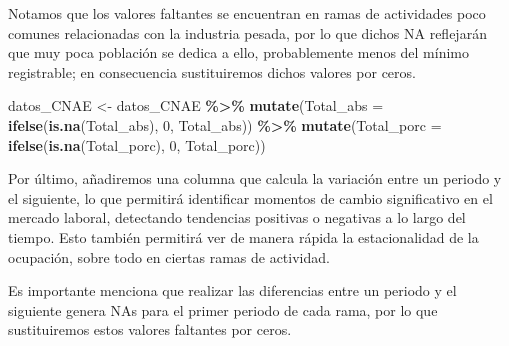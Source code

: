 \documentclass[notspecified,article,submit,moreauthors,pdftex]{Definitions/mdpi}
\newenvironment{Shaded}{\begin{snugshade}}{\end{snugshade}}
\newcommand{\AttributeTok}[1]{\textcolor[rgb]{0.13,0.29,0.53}{#1}}
\newcommand{\DecValTok}[1]{\textcolor[rgb]{0.00,0.00,0.81}{#1}}
\newcommand{\FunctionTok}[1]{\textcolor[rgb]{0.13,0.29,0.53}{\textbf{#1}}}
\newcommand{\NormalTok}[1]{#1}
\newcommand{\OtherTok}[1]{\textcolor[rgb]{0.56,0.35,0.01}{#1}}
\newcommand{\SpecialCharTok}[1]{\textcolor[rgb]{0.81,0.36,0.00}{\textbf{#1}}}
\begin{document}
Notamos que los valores faltantes se encuentran en ramas de actividades
poco comunes relacionadas con la industria pesada, por lo que dichos NA
reflejarán que muy poca población se dedica a ello, probablemente menos
del mínimo registrable; en consecuencia sustituiremos dichos valores por
ceros.

\begin{Shaded}
\begin{Highlighting}[]
\NormalTok{datos\_CNAE }\OtherTok{\textless{}{-}}\NormalTok{ datos\_CNAE }\SpecialCharTok{\%\textgreater{}\%} \FunctionTok{mutate}\NormalTok{(}\AttributeTok{Total\_abs =} \FunctionTok{ifelse}\NormalTok{(}\FunctionTok{is.na}\NormalTok{(Total\_abs), }\DecValTok{0}\NormalTok{, Total\_abs)) }\SpecialCharTok{\%\textgreater{}\%} \FunctionTok{mutate}\NormalTok{(}\AttributeTok{Total\_porc =} \FunctionTok{ifelse}\NormalTok{(}\FunctionTok{is.na}\NormalTok{(Total\_porc), }\DecValTok{0}\NormalTok{, Total\_porc))}
\end{Highlighting}
\end{Shaded}

Por último, añadiremos una columna que calcula la variación entre un
periodo y el siguiente, lo que permitirá identificar momentos de cambio
significativo en el mercado laboral, detectando tendencias positivas o
negativas a lo largo del tiempo. Esto también permitirá ver de manera
rápida la estacionalidad de la ocupación, sobre todo en ciertas ramas de
actividad.

Es importante menciona que realizar las diferencias entre un periodo y
el siguiente genera NAs para el primer periodo de cada rama, por lo que
sustituiremos estos valores faltantes por ceros.
\end{document}
